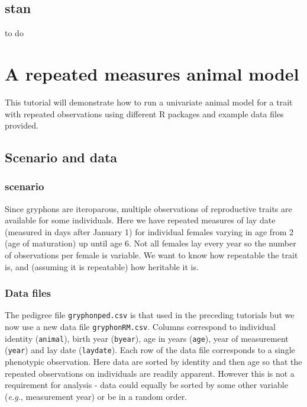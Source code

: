 \documentclass[
  12pt,
]{book}
\begin{document}
\hypertarget{stan-1}{%
\section{stan}\label{stan-1}}

to do

\hypertarget{rep_measures}{%
\chapter{A repeated measures animal model}\label{rep_measures}}

This tutorial will demonstrate how to run a univariate animal model for a trait with repeated observations using different R packages and example data files provided.

\hypertarget{scenario-and-data-2}{%
\section{Scenario and data}\label{scenario-and-data-2}}

\hypertarget{scenario-2}{%
\subsection{scenario}\label{scenario-2}}

Since gryphons are iteroparous, multiple observations of reproductive traits are available for some individuals. Here we have repeated measures of lay date (measured in days after January 1) for individual females varying in age from 2 (age of maturation) up until age 6. Not all females lay every year so the number of observations per female is variable. We want to know how repeatable the trait is, and (assuming it is repeatable) how heritable it is.

\hypertarget{data-files-2}{%
\subsection{Data files}\label{data-files-2}}

The pedigree file \texttt{gryphonped.csv} is that used in the preceding tutorials but we now use a new data file \texttt{gryphonRM.csv}. Columns correspond to individual identity (\texttt{animal}), birth year (\texttt{byear}), age in years (\texttt{age}), year of measurement (\texttt{year}) and lay date (\texttt{laydate}). Each row of the data file corresponds to a single phenotypic observation. Here data are sorted by identity and then age so that the repeated observations on individuals are readily apparent. However this is not a requirement for analysis - data could equally be sorted by some other variable (\emph{e.g.}, measurement year) or be in a random order.
\end{document}
